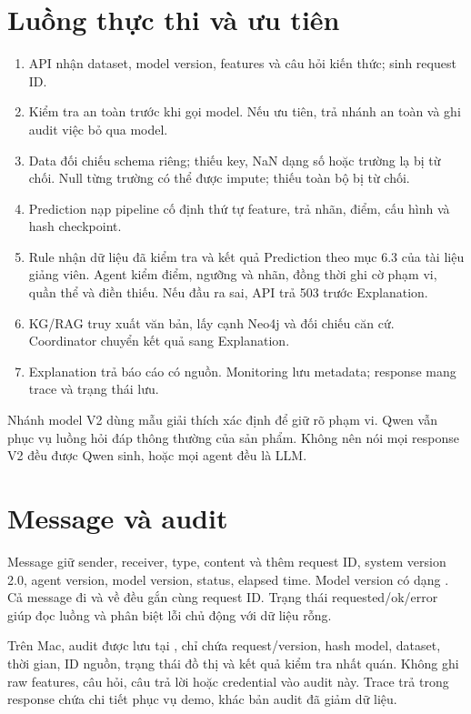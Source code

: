 \section{Luồng thực thi và ưu tiên}
\begin{enumerate}
\item API nhận dataset, model version, features và câu hỏi kiến thức; sinh request ID.
\item Kiểm tra an toàn trước khi gọi model. Nếu ưu tiên, trả nhánh an toàn và ghi audit việc bỏ qua model.
\item Data đối chiếu schema riêng; thiếu key, NaN dạng số hoặc trường lạ bị từ chối. Null từng trường có thể được impute; thiếu toàn bộ bị từ chối.
\item Prediction nạp pipeline cố định thứ tự feature, trả nhãn, điểm, cấu hình và hash checkpoint.
\item Rule nhận dữ liệu đã kiểm tra và kết quả Prediction theo mục 6.3 của tài liệu giảng viên. Agent kiểm điểm, ngưỡng và nhãn, đồng thời ghi cờ phạm vi, quần thể và điền thiếu. Nếu đầu ra sai, API trả 503 trước Explanation.
\item KG/RAG truy xuất văn bản, lấy cạnh Neo4j và đối chiếu căn cứ. Coordinator chuyển kết quả sang Explanation.
\item Explanation trả báo cáo có nguồn. Monitoring lưu metadata; response mang trace và trạng thái lưu.
\end{enumerate}
Nhánh model V2 dùng mẫu giải thích xác định để giữ rõ phạm vi. Qwen vẫn phục vụ luồng hỏi đáp thông thường của sản phẩm. Không nên nói mọi response V2 đều được Qwen sinh, hoặc mọi agent đều là LLM.

\section{Message và audit}
Message giữ sender, receiver, type, content và thêm request ID, system version 2.0, agent version, model version, status, elapsed time. Model version có dạng . Cả message đi và về đều gắn cùng request ID. Trạng thái requested/ok/error giúp đọc luồng và phân biệt lỗi chủ động với dữ liệu rỗng.

Trên Mac, audit được lưu tại , chỉ chứa request/version, hash model, dataset, thời gian, ID nguồn, trạng thái đồ thị và kết quả kiểm tra nhất quán. Không ghi raw features, câu hỏi, câu trả lời hoặc credential vào audit này. Trace trả trong response chứa chi tiết phục vụ demo, khác bản audit đã giảm dữ liệu.

